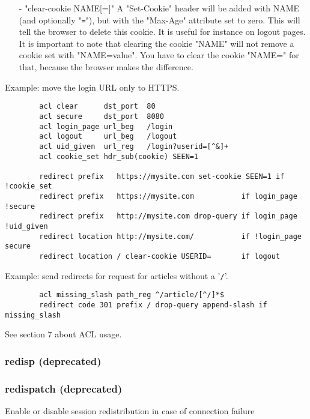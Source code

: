 \begin{description}
\begin{itemize}
      \item[-] "clear-cookie NAME[=]"
        A "Set-Cookie" header will be added with NAME (and optionally "\verb|=|"), but
        with the "Max-Age" attribute set to zero. This will tell the browser to
        delete this cookie. It is useful for instance on logout pages. It is
        important to note that clearing the cookie "NAME" will not remove a
        cookie set with "NAME=value". You have to clear the cookie "NAME=" for
        that, because the browser makes the difference.
      \end{itemize}
  \end{description}

  Example: move the login URL only to HTTPS.
  \begin{verbatim}
        acl clear      dst_port  80
        acl secure     dst_port  8080
        acl login_page url_beg   /login
        acl logout     url_beg   /logout
        acl uid_given  url_reg   /login?userid=[^&]+
        acl cookie_set hdr_sub(cookie) SEEN=1

        redirect prefix   https://mysite.com set-cookie SEEN=1 if !cookie_set
        redirect prefix   https://mysite.com           if login_page !secure
        redirect prefix   http://mysite.com drop-query if login_page !uid_given
        redirect location http://mysite.com/           if !login_page secure
        redirect location / clear-cookie USERID=       if logout
  \end{verbatim}

  Example: send redirects for request for articles without a '\verb|/|'.
  \begin{verbatim}
        acl missing_slash path_reg ^/article/[^/]*$
        redirect code 301 prefix / drop-query append-slash if missing_slash
  \end{verbatim}

  See section 7 about ACL usage.

\subsubsection[redisp]{redisp (deprecated)}
\subsubsection[redispatch]{redispatch (deprecated)}


  Enable or disable session redistribution in case of connection failure

